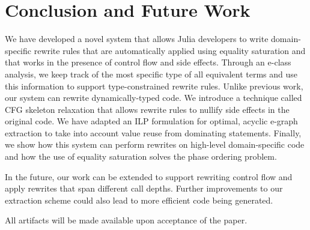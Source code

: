 
\section{Conclusion and Future Work}
\label{sec:conclusions}
We have developed a novel system that allows Julia developers to write domain-specific rewrite rules that are automatically applied using equality saturation and that works in the presence of control flow and side effects.
Through an e-class analysis, we keep track of the most specific type of all equivalent terms and use this information to support type-constrained rewrite rules.
Unlike previous work, our system can rewrite dynamically-typed code.
We introduce a technique called CFG skeleton relaxation that allows rewrite rules to nullify side effects in the original code.
We have adapted an ILP formulation for optimal, acyclic e-graph extraction to take into account value reuse from dominating statements.
Finally, we show how this system can perform rewrites on high-level domain-specific code and how the use of equality saturation solves the phase ordering problem.

In the future, our work can be extended to support rewriting control flow and apply rewrites that span different call depths.
Further improvements to our extraction scheme could also lead to more efficient code being generated.

All artifacts will be made available upon acceptance of the paper.
